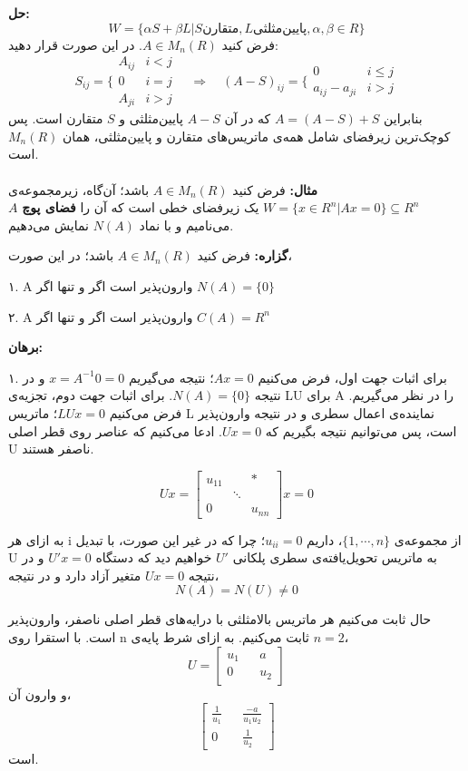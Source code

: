 \textbf{حل:}
$$W=\{\alpha S+ \beta L | S \text{متقارن}, L\text{پایین‌مثلثی}, \alpha,\beta\in R\}$$
فرض کنید $A\in M_{n}(R)$. در این صورت قرار دهید:
$$S_{ij} = \Bigg\{\begin{array}{ccccc}
A_{ij} &  i<j\\
0 & i=j\\
A_{ji} & i>j
\end{array} \quad\Rightarrow\quad (A-S)_{ij} = \Bigg\{\begin{array}{ccc}
0 & i\leq j\\
a_{ij} - a_{ji}&i>j
\end{array}$$
بنابراین $A = (A-S) + S$ که در آن $A-S$ پایین‌مثلثی و $S$ متقارن است. پس کوچک‌ترین زیر‌فضا‌ی شامل همه‌ی ماتریس‌های متقارن و پایین‌مثلثی، همان $M_{n}(R)$ است.\\\\
\textbf{مثال:}
فرض کنید $A\in M_{n}(R)$ باشد؛ آن‌گاه، زیر‌مجموعه‌ی $W=\{x\in R^n| Ax = 0\}\subseteq R^n$ یک زیر‌فضا‌ی خطی است که آن را \textbf{فضای پوچ} $A$ می‌نامیم و با نماد $N(A)$ نمایش می‌دهیم.

\textbf{گزاره: }
فرض کنید $A\in M_{n}(R)$ باشد؛ در این صورت،

۱. A وارون‌پذیر است اگر و تنها اگر $N(A) = \{ 0 \}$

۲. A وارون‌پذیر است اگر و تنها اگر $C(A) = R^n$

\textbf{برهان: }

۱. برای اثبات جهت اول، فرض می‌کنیم $Ax = 0$؛ نتیجه می‌گیریم $x = A^{-1} 0 = 0$ و در نتیجه $N(A) = \{ 0 \}$. برای اثبات جهت دوم، تجزیه‌ی LU برای A را در نظر می‌گیریم. فرض می‌کنیم $LUx = 0$؛ ماتریس L نماینده‌ی اعمال سطری و در نتیجه وارون‌پذیر است، پس می‌توانیم نتیجه بگیریم که $Ux = 0$. ادعا می‌کنیم که عناصر روی قطر اصلی U ناصفر هستند.

$$Ux = \begin{bmatrix}
u_{11} &&*\\
&\ddots&\\
0 && u_{nn}
\end{bmatrix}x = 0$$

به ازای هر i از مجموعه‌ی $\{1,\cdots ,n\}$، داریم $u_{ii}=0$؛ چرا که در غیر این صورت، با تبدیل U به ماتریس تحویل‌یافته‌ی سطری پلکانی $U'$ خواهیم دید که دستگاه $U'x=0$ و در نتیجه $Ux=0$ متغیر آزاد دارد و در نتیجه،
$$N(A) = N(U) \neq 0$$

حال ثابت می‌کنیم هر ماتریس بالامثلثی با درایه‌های قطر اصلی ناصفر، وارون‌پذیر است. با استقرا روی n ثابت می‌کنیم. به ازای شرط پایه‌ی $n=2$،
$$U = \begin{bmatrix}
u_{1} && a\\
0 && u_{2}
\end{bmatrix}$$
و وارون آن،
$$\begin{bmatrix}
\frac{1}{u_{1}} && \frac{-a}{u_{1} u_2}\\
0 && \frac{1}{u_{2}}
\end{bmatrix}$$
است.

